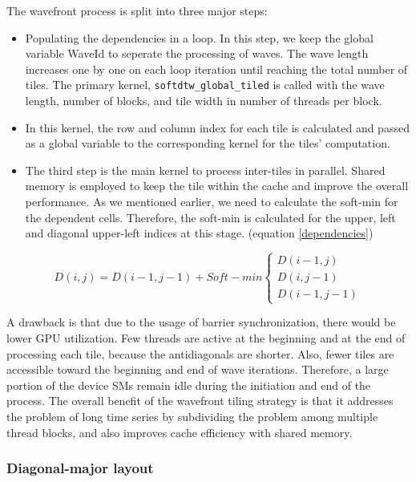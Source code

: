 \documentclass[12pt, letterpaper]{article}
\begin{document}
The wavefront process is split into three major steps:

\begin{itemize}
  \item Populating the dependencies in a loop. In this step, we keep the global
    variable WaveId to seperate the processing of waves. The wave length
    increases one by one on each loop iteration until reaching the total number
    of tiles. The primary kernel, \verb|softdtw_global_tiled| is called with the
    wave length, number of blocks, and tile width in number of threads per block.
  \item In this kernel, the row and column index for each tile is calculated and
    passed as a global variable to the corresponding kernel for the tiles’
    computation.
  \item The third step is the main kernel to process inter-tiles in
    parallel. Shared memory is employed to keep the tile within the cache and
    improve the overall performance. As we mentioned earlier, we need to
    calculate the soft-min for the dependent cells. Therefore, the soft-min is
    calculated for the upper, left and diagonal upper-left indices at this
    stage. (equation \ref{dependencies})
\end{itemize}

\begin{equation} \label{dependencies}
  D (i,j) = D(i-1, j-1) + Soft-min
  \begin{cases}
        D(i-1,j) \\
        D(i,j-1)\\
        D(i-1,j-1)
  \end{cases}
\end{equation}

A drawback is that due to the usage of barrier synchronization, there would be
lower GPU utilization. Few threads are active at the beginning and at the end of
processing each tile, because the antidiagonals are shorter. Also, fewer tiles
are accessible toward the beginning and end of wave iterations. Therefore, a
large portion of the device SMs remain idle during the initiation and end of the
process. The overall benefit of the wavefront tiling strategy is that it
addresses the problem of long time series by subdividing the problem among
multiple thread blocks, and also improves cache efficiency with shared memory.

\subsubsection{Diagonal-major layout}
\end{document}
